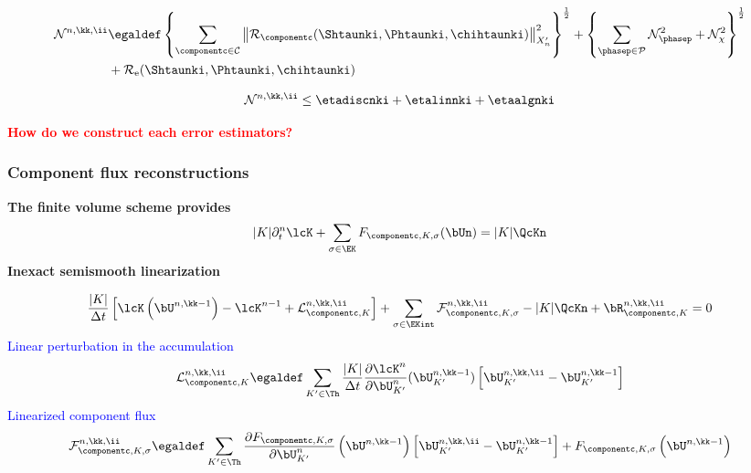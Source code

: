 \documentclass[10 pt]{beamer}
\begin{document}
\begin{frame}
\begin{definition}
\begin{equation*}
\begin{split}
\mathcal{N}^{n,\kk,\ii} & \egaldef \left\{\sum_{\componentc \in\mathcal{C}} \left\|\mathcal{R}_{\componentc}(\Shtaunki,\Phtaunki,\chihtaunki) \right\|_{X_n'}^2 \right\}^{\frac{1}{2}} + \left\{\sum_{\phasep \in \mathcal{P}}\mathcal{N}_{\phasep}^2 + \mathcal{N}_{\chi}^2\right\}^{\frac{1}{2}}\\
& + \mathcal{R}_{\mathrm{e}}(\Shtaunki,\Phtaunki,\chihtaunki)
\end{split}
\end{equation*}
\end{definition}
\begin{theorem}
\begin{equation*}
\mathcal{N}^{n,\kk,\ii} \leq \etadiscnki + \etalinnki + \etaalgnki
\end{equation*}  
\end{theorem}
\textcolor{red}{\textbf{How do we construct each error estimators?}}
\end{frame}
\begin{frame}
\frametitle{Component flux reconstructions}
\textcolor{cadmiumgreen}{\textbf{The finite volume scheme provides}}
\begin{equation*} 
  |K| \partial_t^n \lcK + \sum_{\sigma \in \EK} {F}_{\componentc,K,\sigma}(\bUn) =  |K|\QcKn
\end{equation*}
\textcolor{cadmiumgreen}{\textbf{Inexact semismooth linearization}}

\begin{equation*}
\label{eq:flux:equation}
 \frac{|K|}{\Delta t}\left[\lcK\left(\bU^{n,\kk-1}\right) - \lcK^{n-1} + \mathcal{L}_{\componentc,K}^{n,\kk,\ii}\right] + \sum_{\sigma \in \EKint} \mathcal{F}_{\componentc,K,\sigma}^{n,\kk,\ii}- |K|\QcKn + {\bR}_{\componentc,K}^{n,\kk,\ii} = 0
\end{equation*}
 \textcolor{blue}{Linear perturbation in the accumulation}
\begin{equation*}
\mathcal{L}_{\componentc,K}^{n,\kk,\ii} \egaldef \sum_{K' \in \Th} \frac{|K|}{\Delta t}  \frac{\partial \lcK^n}{\partial \bU_{K'}^n}(\bU_{K'}^{n,\kk-1}) \left[\bU_{K'}^{n,\kk,\ii}-\bU_{K'}^{n,\kk-1} \right]
\end{equation*}
\textcolor{blue}{Linearized component flux}
\begin{equation*}
\label{eq:linearized:semi:smooth:component:flux}
\mathcal{F}_{\componentc,K,\sigma}^{n,\kk,\ii} \egaldef \sum_{K' \in \Th} \frac{\partial {F}_{\componentc,K,\sigma}}{\partial \bU_{K'}^n} \left(\bU^{n,\kk-1}\right) \left[\bU_{K'}^{n,\kk,\ii} -\bU_{K'}^{n,\kk-1} \right] + {F}_{\componentc,K,\sigma}\left(\bU^{n,\kk-1}\right)
\end{equation*}
\end{frame}
\end{document}
